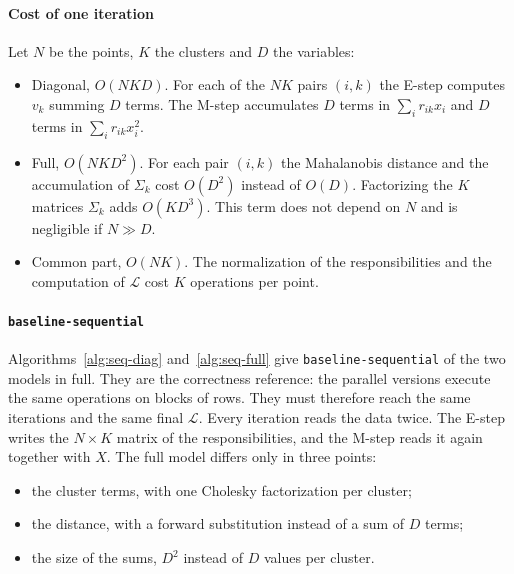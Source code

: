 \documentclass[conference,onecolumn]{IEEEtran}
\newcommand{\vseq}{\texttt{baseline-\allowbreak sequential}}
\begin{document}
\paragraph{Cost of one iteration} Let $N$ be the points, $K$ the clusters and $D$ the variables:
\begin{itemize}
\item Diagonal, $O(NKD)$. For each of the $NK$ pairs $(i,k)$ the E-step computes $v_k$ summing $D$ terms. The M-step accumulates $D$ terms in $\sum_i r_{ik}x_i$ and $D$ terms in $\sum_i r_{ik}x_i^2$.
\item Full, $O(NKD^2)$. For each pair $(i,k)$ the Mahalanobis distance and the accumulation of $\Sigma_k$ cost $O(D^2)$ instead of $O(D)$. Factorizing the $K$ matrices $\Sigma_k$ adds $O(KD^3)$. This term does not depend on $N$ and is negligible if $N\gg D$.
\item Common part, $O(NK)$. The normalization of the responsibilities and the computation of $\mathcal{L}$ cost $K$ operations per point.
\end{itemize}

\paragraph{\vseq{}} Algorithms~\ref{alg:seq-diag} and~\ref{alg:seq-full} give \vseq{} of the two models in full. They are the correctness reference: the parallel versions execute the same operations on blocks of rows. They must therefore reach the same iterations and the same final $\mathcal{L}$. Every iteration reads the data twice. The E-step writes the $N\times K$ matrix of the responsibilities, and the M-step reads it again together with $X$. The full model differs only in three points:
\begin{itemize}
\item the cluster terms, with one Cholesky factorization per cluster;
\item the distance, with a forward substitution instead of a sum of $D$ terms;
\item the size of the sums, $D^2$ instead of $D$ values per cluster.
\end{itemize}
\end{document}

